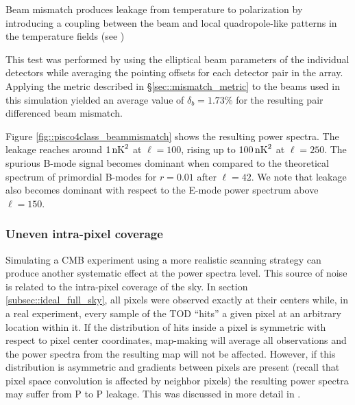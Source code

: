 \documentclass[a4paper,11pt]{article}
\begin{document}
Beam mismatch produces leakage from temperature to polarization by introducing a coupling between the beam and local quadropole-like patterns in the temperature fields (see \cite{2007MNRAS.376.1767O}) 

This test was performed by using the elliptical beam parameters of the individual detectors while averaging the pointing offsets for each detector pair in the array. Applying the metric described in \S\ref{sec::mismatch_metric} to the beams used in this simulation yielded an average value of  $\delta_b = 1.73\%$ for the resulting pair differenced beam mismatch. 

Figure \ref{fig::pisco4class_beammismatch} shows the resulting power spectra. The leakage reaches around $1\, \rm{nK}^2$ at $\ell=100$, rising up to $100 \, \rm{nK}^2$ at $\ell=250$. The spurious B-mode signal becomes dominant when compared to the theoretical spectrum of primordial B-modes for $r=0.01$ after $\ell=42$. We note that leakage also becomes dominant with respect to the E-mode power spectrum above $\ell=150$. 

\subsubsection{Uneven intra-pixel coverage}

Simulating a CMB experiment using a more realistic scanning strategy can produce another systematic effect at the power spectra level. This source of noise is related to the intra-pixel coverage of the sky. In section \ref{subsec::ideal_full_sky}, all pixels were observed exactly at their centers while, in a real experiment, every sample of the TOD ``hits'' a given pixel at an arbitrary location within it. If the distribution of hits inside a pixel is symmetric with respect to pixel center coordinates, map-making will average all observations and the power spectra from the resulting map will not be affected. However, if this distribution is asymmetric and gradients between pixels are present (recall that pixel space convolution is affected by neighbor pixels) the resulting power spectra may suffer from P to P leakage. This was discussed in more detail in \cite{2005poutanen}. 
\end{document}
